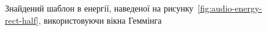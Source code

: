 \begin{figure}[!h]

            \caption{Знайдений шаблон в енергії, наведеної на рисунку~\ref{fig:audio-energy-rect-half}, використовуючи
                вікна Геммінга}\label{fig:matched-energy-rect-half-hamming}
        \end{figure}





